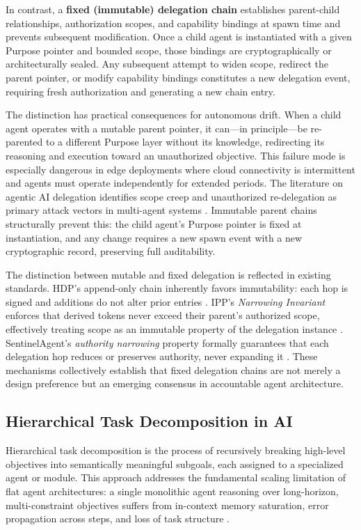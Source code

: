 In contrast, a \textbf{fixed (immutable) delegation chain} establishes parent-child relationships, authorization scopes, and capability bindings at spawn time and prevents subsequent modification. Once a child agent is instantiated with a given Purpose pointer and bounded scope, those bindings are cryptographically or architecturally sealed. Any subsequent attempt to widen scope, redirect the parent pointer, or modify capability bindings constitutes a new delegation event, requiring fresh authorization and generating a new chain entry.

The distinction has practical consequences for autonomous drift. When a child agent operates with a mutable parent pointer, it can---in principle---be re-parented to a different Purpose layer without its knowledge, redirecting its reasoning and execution toward an unauthorized objective. This failure mode is especially dangerous in edge deployments where cloud connectivity is intermittent and agents must operate independently for extended periods. The literature on agentic AI delegation identifies scope creep and unauthorized re-delegation as primary attack vectors in multi-agent systems \cite{dibbo_etal_2026_hdp_formal, wu_etal_2024_governance}. Immutable parent chains structurally prevent this: the child agent's Purpose pointer is fixed at instantiation, and any change requires a new spawn event with a new cryptographic record, preserving full auditability.

The distinction between mutable and fixed delegation is reflected in existing standards. HDP's append-only chain inherently favors immutability: each hop is signed and additions do not alter prior entries \cite{helixar_2026_hdp}. IPP's \emph{Narrowing Invariant} enforces that derived tokens never exceed their parent's authorized scope, effectively treating scope as an immutable property of the delegation instance \cite{haberkamp_2025_ipp}. SentinelAgent's \emph{authority narrowing} property formally guarantees that each delegation hop reduces or preserves authority, never expanding it \cite{sentinel_2025}. These mechanisms collectively establish that fixed delegation chains are not merely a design preference but an emerging consensus in accountable agent architecture.

\subsection{Hierarchical Task Decomposition in AI}
\label{sec:background_htd}

Hierarchical task decomposition is the process of recursively breaking high-level objectives into semantically meaningful subgoals, each assigned to a specialized agent or module. This approach addresses the fundamental scaling limitation of flat agent architectures: a single monolithic agent reasoning over long-horizon, multi-constraint objectives suffers from in-context memory saturation, error propagation across steps, and loss of task structure \cite{mao_etal_2025_hiplan, chen_etal_2025_reactree, lu_etal_2025_hipere}.

